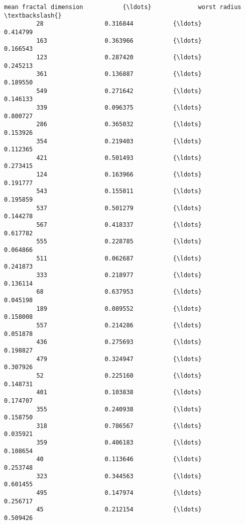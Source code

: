 \documentclass[11pt]{article}
\begin{document}
\begin{Verbatim}[commandchars=\\\{\}]
              mean fractal dimension           {\ldots}             worst radius  \textbackslash{}
         28                 0.316844           {\ldots}                 0.414799   
         163                0.363966           {\ldots}                 0.166543   
         123                0.287420           {\ldots}                 0.245213   
         361                0.136887           {\ldots}                 0.189550   
         549                0.271642           {\ldots}                 0.146133   
         339                0.096375           {\ldots}                 0.800727   
         286                0.365032           {\ldots}                 0.153926   
         354                0.219403           {\ldots}                 0.112365   
         421                0.501493           {\ldots}                 0.273415   
         124                0.163966           {\ldots}                 0.191777   
         543                0.155011           {\ldots}                 0.195859   
         537                0.501279           {\ldots}                 0.144278   
         567                0.418337           {\ldots}                 0.617782   
         555                0.228785           {\ldots}                 0.064866   
         511                0.062687           {\ldots}                 0.241873   
         333                0.218977           {\ldots}                 0.136114   
         68                 0.637953           {\ldots}                 0.045198   
         189                0.089552           {\ldots}                 0.158008   
         557                0.214286           {\ldots}                 0.051878   
         436                0.275693           {\ldots}                 0.198827   
         479                0.324947           {\ldots}                 0.307926   
         52                 0.225160           {\ldots}                 0.148731   
         401                0.103838           {\ldots}                 0.174707   
         355                0.240938           {\ldots}                 0.158750   
         318                0.786567           {\ldots}                 0.035921   
         359                0.406183           {\ldots}                 0.108654   
         40                 0.113646           {\ldots}                 0.253748   
         323                0.344563           {\ldots}                 0.601455   
         495                0.147974           {\ldots}                 0.256717   
         45                 0.212154           {\ldots}                 0.509426   

\end{Verbatim}
\end{document}
